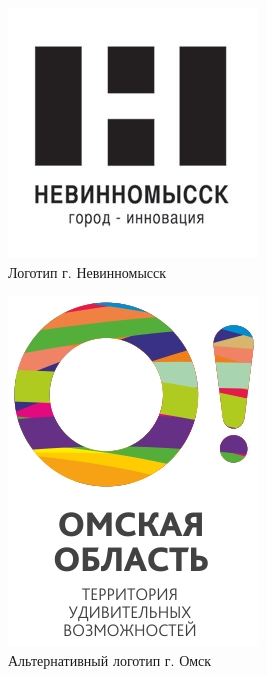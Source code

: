 \begin{figure}[ht]
  \centering
  \includegraphics[width=.5\linewidth]{images/supplement/territorial/nevinnomisk}
  \caption{Логотип г. Невинномысск}
  \label{fig:territorial:nevinnomisk}
\end{figure}

\begin{figure}[ht]
  \centering
  \includegraphics[width=.5\linewidth]{images/supplement/territorial/omsk}
  \caption{Альтернативный логотип г. Омск}
  \label{fig:territorial:omsk}
\end{figure}
